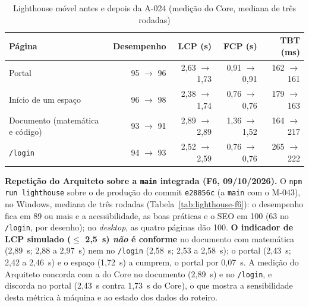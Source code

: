 \begin{table}[htbp]
\centering
\small
\caption{Lighthouse móvel antes e depois da A-024 (medição do Core, mediana de três rodadas)}\label{tab:lighthouse-a024}
\begin{tabular}{@{}lrrrr@{}}
\toprule
\textbf{Página} & \textbf{Desempenho} & \textbf{LCP (s)} & \textbf{FCP (s)} & \textbf{TBT (ms)}\\
\midrule
Portal & 95 $\to$ 96 & 2,63 $\to$ 1,73 & 0,91 $\to$ 0,91 & 162 $\to$ 161\\
Início de um espaço & 96 $\to$ 98 & 2,38 $\to$ 1,74 & 0,76 $\to$ 0,76 & 179 $\to$ 163\\
Documento (matemática e código) & 93 $\to$ 91 & 2,89 $\to$ 2,89 & 1,36 $\to$ 1,52 & 164 $\to$ 217\\
\texttt{/login} & 94 $\to$ 93 & 2,52 $\to$ 2,59 & 0,76 $\to$ 0,76 & 265 $\to$ 222\\
\bottomrule
\end{tabular}
\end{table}

\textbf{Repetição do Arquiteto sobre a \texttt{main} integrada (F6, 09/10/2026).} O \texttt{npm run lighthouse} sobre o  de produção do commit \texttt{e28856c} (a \texttt{main} com o M-043), no Windows, mediana de três rodadas (Tabela~\ref{tab:lighthouse-f6}): o desempenho fica em 89 ou mais e a acessibilidade, as boas práticas e o SEO em 100 (63 no \texttt{/login}, por desenho); no \emph{desktop}, as quatro páginas dão 100. \textbf{O indicador de LCP simulado ($\leq$ 2,5~s) \emph{não} é conforme} no documento com matemática (2,89~s; 2,88 a 2,97~s) nem no \texttt{/login} (2,58~s; 2,53 a 2,58~s); o portal (2,43~s; 2,42 a 2,46~s) e o espaço (1,72~s) a cumprem, o portal por 0,07~s. A medição do Arquiteto concorda com a do Core no documento (2,89~s) e no \texttt{/login}, e discorda no portal (2,43~s contra 1,73~s do Core), o que mostra a sensibilidade desta métrica à máquina e ao estado dos dados do roteiro.

